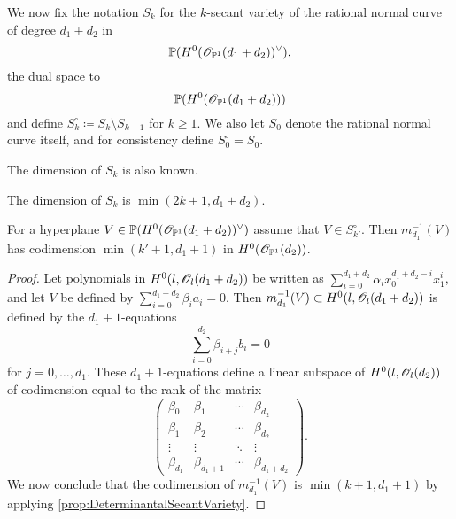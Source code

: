 \begin{definition}
	We now fix the notation $S_k$ for the $k$-secant variety of the rational normal curve of degree $d_1+d_2$ in 
\[ \mathbb{P}(H^0(\mathscr{O}_{\mathbb{P}^1}(d_1+d_2))^\vee),\]
the dual space to 
\[ \mathbb{P}(H^0(\mathscr{O}_{\mathbb{P}^1}(d_1+d_2)))\]
and define $S_k^\circ \coloneqq S_k \setminus S_{k-1}$ for $k \geq 1$. We also let $S_0$ denote the rational normal curve itself, and for consistency define $S_0^\circ = S_0$. 
\end{definition}

The dimension of $S_k$ is also known.
\begin{proposition}
  The dimension of $S_k$ is $\min(2k+1,d_1+d_2)$.
\end{proposition}
%

\begin{lemma}
  \label{lem:MultiplicationMapCodimension}
For a hyperplane $V \in \mathbb{P}(H^0(\mathscr{O}_{\mathbb{P}^1}(d_1+d_2))^\vee)$ assume that $V \in S_{k'}^\circ$. 
  Then $m_{d_1}^{-1}(V)$ has codimension $\min(k'+1,d_1+1)$ in $H^0(\mathscr{O}_{\mathbb{P}^1}(d_2))$.
\end{lemma}

\begin{proof}
Let polynomials in $H^0(l,\mathscr{O}_l(d_1+d_2))$ be written as $\sum_{i=0}^{d_1+d_2}\alpha_ix_0^{d_1+d_2-i}x_1^i$, and let $V$ be defined by $\sum_{i=0}^{d_1+d_2}\beta_ia_i = 0$. Then $m_{d_1}^{-1}(V) \subset H^0(l,\mathscr{O}_l(d_1+d_2))$ is defined by the $d_1+1$-equations
\[ \sum_{i=0}^{d_2} \beta_{i+j}b_i = 0 \]
for $j = 0,\dots,d_1$. These $d_1+1$-equations define a linear subspace of $H^0(l,\mathscr{O}_l(d_2))$ of codimension equal to the rank of the matrix
\[
  \begin{pmatrix}
    \beta_0 & \beta_1 & \cdots & \beta_{d_2} \\
    \beta_1 & \beta_2 & \cdots & \beta_{d_2}\\
    \vdots & \vdots & \ddots & \vdots \\
    \beta_{d_1} & \beta_{d_1+1} & \cdots & \beta_{d_1+d_2}
  \end{pmatrix}.
\]
We now conclude that the codimension of  $m_{d_1}^{-1}(V)$ is ${\min(k+1,d_1+1)}$ by applying \cref{prop:DeterminantalSecantVariety}.
\end{proof}

